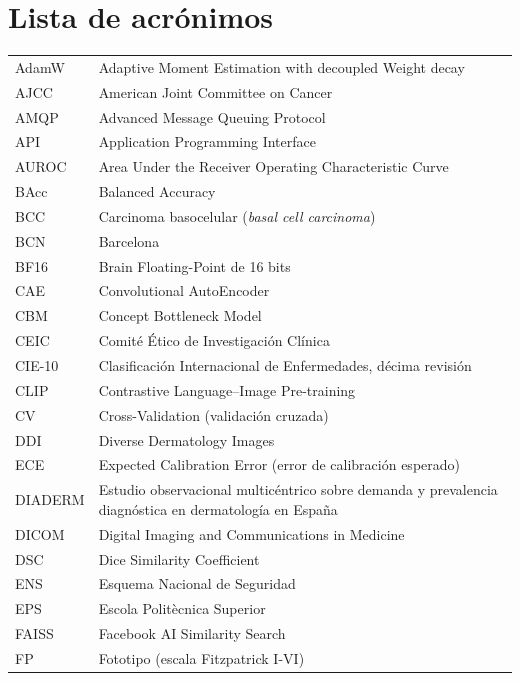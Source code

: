 
\chapter*{Lista de acrónimos}

\begin{tabular}{p{}p{}}
AdamW & Adaptive Moment Estimation with decoupled Weight decay \\
AJCC & American Joint Committee on Cancer \\
AMQP & Advanced Message Queuing Protocol \\
API & Application Programming Interface \\
AUROC & Area Under the Receiver Operating Characteristic Curve \\
BAcc & Balanced Accuracy \\
BCC & Carcinoma basocelular (\emph{basal cell carcinoma}) \\
BCN & Barcelona \\
BF16 & Brain Floating-Point de 16 bits \\
CAE & Convolutional AutoEncoder \\
CBM & Concept Bottleneck Model \\
CEIC & Comité Ético de Investigación Clínica \\
CIE-10 & Clasificación Internacional de Enfermedades, décima revisión \\
CLIP & Contrastive Language--Image Pre-training \\
CV & Cross-Validation (validación cruzada) \\
DDI & Diverse Dermatology Images \\
ECE & Expected Calibration Error (error de calibración esperado) \\
DIADERM & Estudio observacional multicéntrico sobre demanda y prevalencia diagnóstica en dermatología en España \\
DICOM & Digital Imaging and Communications in Medicine \\
DSC & Dice Similarity Coefficient \\
ENS & Esquema Nacional de Seguridad \\
EPS & Escola Politècnica Superior \\
FAISS & Facebook AI Similarity Search \\
FP & Fototipo (escala Fitzpatrick I-VI) \\

\end{tabular}
